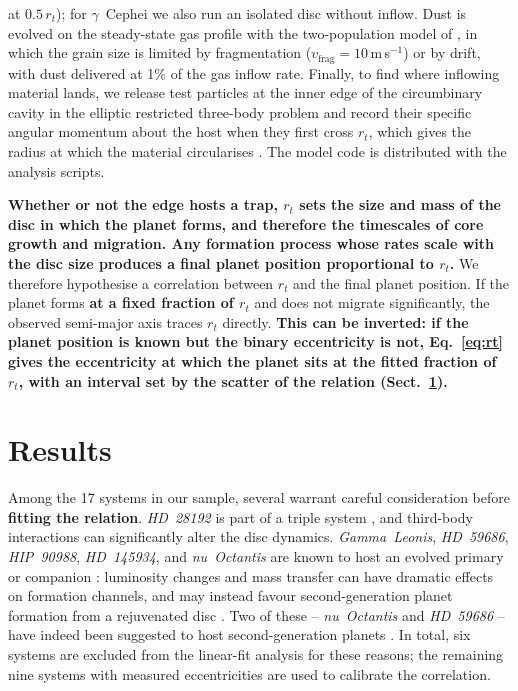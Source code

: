 \documentclass{aa}
\newcommand{\rev}[1]{{\color{red}\textbf{#1}}}
\begin{document}
{at $0.5\,r_t$); for $\gamma$~Cephei we also run an isolated disc without
inflow. Dust is evolved
on the steady-state gas profile with the two-population model of
\citet{Birnstiel2012}, in which the grain size is limited by
fragmentation ($v_\mathrm{frag} = 10$\,m\,s$^{-1}$) or by drift, with
dust delivered at 1\% of the gas inflow rate. Finally, to find where
inflowing material lands, we release test particles at the inner edge of
the circumbinary cavity in the elliptic restricted three-body problem and
record their specific angular momentum about the host when they first
cross $r_t$, which gives the radius at which the material circularises
\citep{Lubow1975}. The model code is distributed with the analysis
scripts.}

\rev{Whether or not the edge hosts a trap, $r_t$ sets the size and mass of
the disc in which the planet forms, and therefore the timescales of core
growth and migration. Any formation process whose rates scale with the
disc size produces a final planet position proportional to $r_t$.}
We therefore hypothesise a correlation between $r_t$ and the final
planet position. If the planet forms \rev{at a fixed fraction of $r_t$}
and does not migrate significantly, the observed semi-major axis traces
$r_t$ directly. \rev{This can be inverted: if the planet position is
known but the binary eccentricity is not, Eq.~\eqref{eq:rt} gives the
eccentricity at which the planet sits at the fitted fraction of $r_t$,
with an interval set by the scatter of the relation
(Sect.~\ref{sec:results}).}

\section{Results}
\label{sec:results}

Among the 17 systems in our sample, several warrant careful
consideration before \rev{fitting the relation}. \textit{HD~28192}
is part of a triple system \citep{Feng_2022}, and third-body
interactions can significantly alter the disc dynamics.
\textit{Gamma~Leonis}, \textit{HD~59686}, \textit{HIP~90988},
\textit{HD~145934}, and \textit{nu~Octantis} are known to host an
evolved primary or companion \citep{Han2010, Ortiz2016, Jones2021,
Feng2015, cheng_retrograde_2025}: luminosity changes and mass transfer
can have dramatic effects on formation channels, and may instead favour
second-generation planet formation from a rejuvenated disc
\citep{Perets2010, Stegmann2025}. Two of these -- \textit{nu~Octantis}
and \textit{HD~59686} -- have indeed been suggested to host
second-generation planets \citep{cheng_retrograde_2025, Ortiz2016}. In
total, six systems are excluded from the linear-fit analysis for these
reasons; the remaining nine systems with measured eccentricities are
used to calibrate the correlation.
\end{document}

